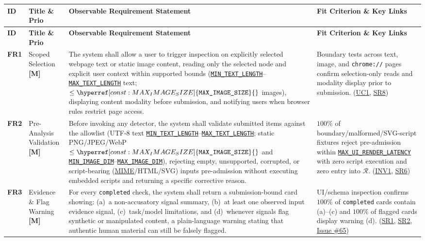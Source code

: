 \documentclass[11pt]{article}
\newcommand{\MinTextLength}{\hyperref[const:MIN_TEXT_LENGTH]{\texttt{MIN\_\allowbreak{}TEXT\_\allowbreak{}LENGTH}}}
\newcommand{\MaxTextLength}{\hyperref[const:MAX_TEXT_LENGTH]{\texttt{MAX\_\allowbreak{}TEXT\_\allowbreak{}LENGTH}}}
\newcommand{\MaxImageSize}{\hyperref[const:MAX_IMAGE_SIZE]{\texttt{MAX\_\allowbreak{}IMAGE\_\allowbreak{}SIZE}}}
\newcommand{\MinImageDim}{\hyperref[const:MIN_IMAGE_DIM]{\texttt{MIN\_\allowbreak{}IMAGE\_\allowbreak{}DIM}}}
\newcommand{\MaxImageDim}{\hyperref[const:MAX_IMAGE_DIM]{\texttt{MAX\_\allowbreak{}IMAGE\_\allowbreak{}DIM}}}
\newcommand{\MaxUiRenderLatency}{\hyperref[const:MAX_UI_RENDER_LATENCY]{\texttt{MAX\_\allowbreak{}UI\_\allowbreak{}RENDER\_\allowbreak{}LATENCY}}}
\newcommand{\MIME}{\hyperlink{acr-mime}{MIME}}
\begin{document}
{\small
\setlength{\tabcolsep}{4pt}
\renewcommand{\arraystretch}{1.03}
\begin{tabularx}{\textwidth}{P{1.1cm} P{2.25cm} Y Q{3.85cm}}
\caption{Functional Requirements (\hyperref[FR1]{FR1}--\hyperref[FR14]{FR14})} \label{TblFuncReqs}\\
\toprule
\textbf{ID} & \textbf{Title \& Prio} & \textbf{Observable Requirement Statement} & \textbf{Fit Criterion \& Key Links}\\
\midrule
\endfirsthead
\toprule
\textbf{ID} & \textbf{Title \& Prio} & \textbf{Observable Requirement Statement} & \textbf{Fit Criterion \& Key Links}\\
\midrule
\endhead
\bottomrule
\endfoot

\label{FR1}\textbf{FR1} & Scoped Selection \textbf{[M]} &
The system shall allow a user to trigger inspection on explicitly selected webpage text or static image content, reading only the selected node and explicit user context within supported bounds (\MinTextLength{}--\MaxTextLength{} text; $\le \MaxImageSize{}$ images), displaying content modality before submission, and notifying users when browser rules restrict page access. &
Boundary tests across text, image, and \texttt{chrome://} pages confirm selection-only reads and modality display prior to submission. (\hyperref[UC1]{UC1}, \hyperref[SR8]{SR8})\\
\midrule

\label{FR2}\textbf{FR2} & Pre-Analysis Validation \textbf{[M]} &
Before invoking any detector, the system shall validate submitted items against the allowlist (UTF-8 text \MinTextLength{}--\MaxTextLength{}; static PNG/JPEG/WebP $\le \MaxImageSize{}$ and \MinImageDim{}--\MaxImageDim{}), rejecting empty, unsupported, corrupted, or script-bearing (\MIME{}/HTML/SVG) inputs pre-admission without executing embedded scripts and returning a specific corrective reason. &
$100\%$ of boundary/malformed/SVG-script fixtures reject pre-admission within \MaxUiRenderLatency{} with zero script execution and zero entry into $\mathcal{R}$. (\hyperref[INV1]{INV1}, \hyperref[SR6]{SR6})\\
\midrule

\label{FR3}\textbf{FR3} & Evidence \& Flag Warning \textbf{[M]} &
For every \texttt{completed} check, the system shall return a submission-bound card showing: (a)~a non-accusatory signal summary, (b)~at least one observed input evidence signal, (c)~task/model limitations, and (d)~whenever signals flag synthetic or manipulated content, a plain-language warning stating that authentic human material can still be falsely flagged. &
UI/schema inspection confirms $100\%$ of \texttt{completed} cards contain (a)--(c) and $100\%$ of flagged cards display warning (d). (\hyperref[SR1]{SR1}, \hyperref[SR2]{SR2}, \href{https://github.com/richy1337/Verity/issues/65}{Issue \#65})\\
\midrule


\end{tabularx}}
\end{document}
